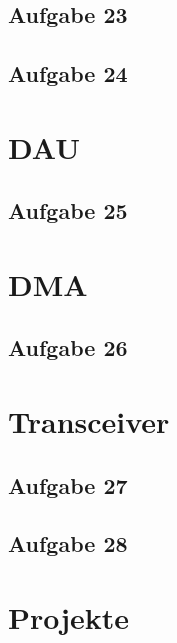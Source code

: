 \documentclass[11pt,a4paper,onecolumn]{report}
\begin{document}
\section{Aufgabe 23}
\section{Aufgabe 24}

\chapter{DAU}

\section{Aufgabe 25}

\chapter{DMA}

\section{Aufgabe 26}

\chapter{Transceiver}

\section{Aufgabe 27}
\section{Aufgabe 28}

\chapter{Projekte}
\end{document}

